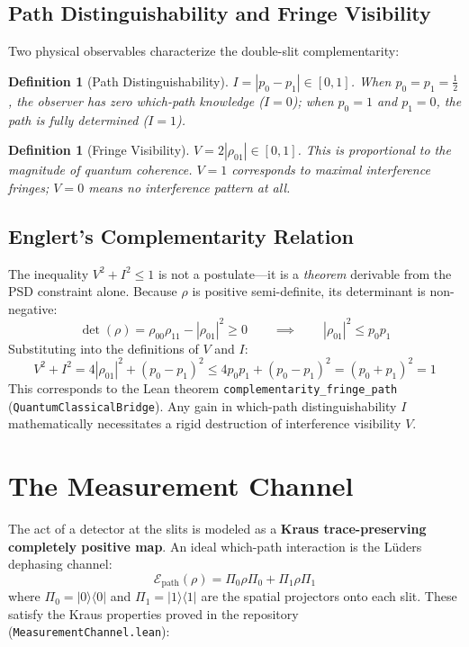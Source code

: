 \documentclass[11pt, a4paper]{article}
\newtheorem{definition}[theorem]{Definition}
\begin{document}
\subsection{Path Distinguishability and Fringe Visibility}

Two physical observables characterize the double-slit complementarity:

\begin{definition}[Path Distinguishability]
$I = |p_0 - p_1| \in [0, 1]$. When $p_0 = p_1 = \tfrac{1}{2}$, the observer has zero which-path knowledge ($I = 0$); when $p_0 = 1$ and $p_1 = 0$, the path is fully determined ($I = 1$).
\end{definition}

\begin{definition}[Fringe Visibility]
$V = 2|\rho_{01}| \in [0, 1]$. This is proportional to the magnitude of quantum coherence. $V = 1$ corresponds to maximal interference fringes; $V = 0$ means no interference pattern at all.
\end{definition}

\subsection{Englert's Complementarity Relation}

The inequality $V^2 + I^2 \le 1$ is not a postulate---it is a \emph{theorem} derivable from the PSD constraint alone. Because $\rho$ is positive semi-definite, its determinant is non-negative:
\[
\det(\rho) = \rho_{00}\rho_{11} - |\rho_{01}|^2 \ge 0 \qquad\implies\qquad |\rho_{01}|^2 \le p_0 p_1
\]
Substituting into the definitions of $V$ and $I$:
\[
V^2 + I^2 = 4|\rho_{01}|^2 + (p_0 - p_1)^2 \le 4p_0 p_1 + (p_0 - p_1)^2 = (p_0 + p_1)^2 = 1
\]
This corresponds to the Lean theorem \texttt{complementarity\_fringe\_path}
(\texttt{QuantumClassicalBridge}). Any gain in which-path distinguishability
$I$ mathematically necessitates a rigid destruction of interference visibility $V$.

\section{The Measurement Channel}

The act of a detector at the slits is modeled as a \textbf{Kraus trace-preserving completely positive map}. An ideal which-path interaction is the L\"uders dephasing channel:
\[
\mathcal{E}_{\mathrm{path}}(\rho) = \Pi_0 \rho \Pi_0 + \Pi_1 \rho \Pi_1
\]
where $\Pi_0 = |0\rangle\langle 0|$ and $\Pi_1 = |1\rangle\langle 1|$ are the spatial projectors onto each slit. These satisfy the Kraus properties proved in the repository (\texttt{MeasurementChannel.lean}):
\end{document}
